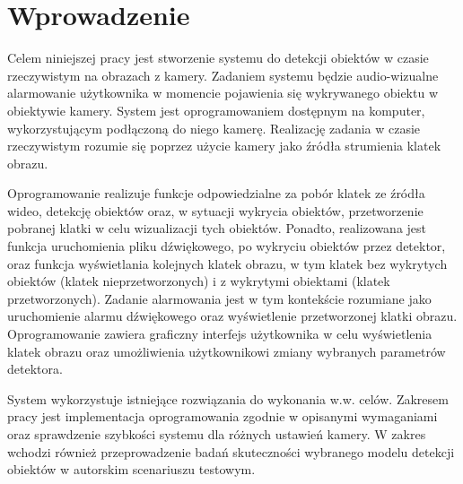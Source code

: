 \chapter{Wprowadzenie}
Celem niniejszej pracy jest stworzenie systemu do detekcji obiektów w czasie rzeczywistym na obrazach z kamery. Zadaniem systemu będzie audio-wizualne alarmowanie użytkownika w momencie pojawienia się wykrywanego obiektu w obiektywie kamery. System jest oprogramowaniem dostępnym na komputer, wykorzystującym podłączoną do niego kamerę. Realizację zadania w czasie rzeczywistym rozumie się poprzez użycie kamery jako źródła strumienia klatek obrazu. 

Oprogramowanie realizuje funkcje odpowiedzialne za pobór klatek ze źródła wideo, detekcję obiektów oraz, w sytuacji wykrycia obiektów, przetworzenie pobranej klatki w celu wizualizacji tych obiektów. Ponadto, realizowana jest funkcja uruchomienia pliku dźwiękowego, po wykryciu obiektów przez detektor, oraz funkcja wyświetlania kolejnych klatek obrazu, w tym klatek bez wykrytych obiektów (klatek nieprzetworzonych) i z wykrytymi obiektami (klatek przetworzonych). Zadanie alarmowania jest w tym kontekście rozumiane jako uruchomienie alarmu dźwiękowego oraz wyświetlenie przetworzonej klatki obrazu. Oprogramowanie zawiera graficzny interfejs użytkownika w celu wyświetlenia klatek obrazu oraz umożliwienia użytkownikowi zmiany wybranych parametrów detektora.

System wykorzystuje istniejące rozwiązania do wykonania w.w. celów. Zakresem pracy jest implementacja oprogramowania zgodnie w opisanymi wymaganiami oraz sprawdzenie szybkości systemu dla różnych ustawień kamery. W zakres wchodzi również przeprowadzenie badań skuteczności wybranego modelu detekcji obiektów w autorskim scenariuszu testowym.